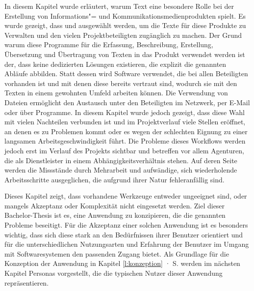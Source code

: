 In diesem Kapitel wurde erläutert, warum Text eine besondere Rolle bei der Erstellung von Informations"= und Kommunikationsmedienprodukten spielt. Es wurde gezeigt, dass  und  ausgewählt werden, um die Texte für diese Produkte zu Verwalten und den vielen Projektbeteiligten zugänglich zu machen. Der Grund warum diese Programme für die Erfassung, Beschreibung, Erstellung, Übersetzung und Übertragung von Texten in das Produkt verwendet werden ist der, dass keine dedizierten Lösungen existieren, die explizit die genannten Abläufe abbilden. Statt dessen wird Software verwendet, die bei allen Beteiligten vorhanden ist und mit denen diese bereits vertraut sind, wodurch sie mit den Texten in einem gewohnten Umfeld arbeiten können. Die Verwendung von Dateien ermöglicht den Austausch unter den Beteiligten im Netzwerk, per E-Mail oder über Programme. In diesem Kapitel wurde jedoch gezeigt, dass diese Wahl mit vielen Nachteilen verbunden ist und im Projektverlauf viele Stellen eröffnet, an denen es zu Problemen kommt oder es wegen der schlechten Eignung zu einer langsamen Arbeitsgeschwindigkeit führt. Die Probleme dieses Workflows werden jedoch erst im Verlauf des Projekts sichtbar und betreffen vor allem Agenturen, die als Dienstleister in einem Abhängigkeitsverhältnis stehen. Auf deren Seite werden die Missstände durch Mehrarbeit und aufwändige, sich wiederholende Arbeitsschritte ausgeglichen, die aufgrund ihrer Natur fehleranfällig sind.

\secbar

Dieses Kapitel zeigt, dass vorhandene Werkzeuge entweder ungeeignet sind, oder mangels Akzeptanz oder Komplexität nicht eingesetzt werden. Ziel dieser Bachelor-Thesis ist es, eine Anwendung zu konzipieren, die die genannten Probleme beseitigt. Für die Akzeptanz einer solchen Anwendung ist es besonders wichtig, dass sich diese stark an den Bedürfnissen ihrer Benutzer orientiert und für die unterschiedlichen Nutzungsarten und Erfahrung der Benutzer im Umgang mit Softwaresystemen den passenden Zugang bietet. Als Grundlage für die Konzeption der Anwendung in Kapitel \ref{l:konzeption} · S.\pageref{l:konzeption} werden im nächsten Kapitel Personas vorgestellt, die die typischen Nutzer dieser Anwendung repräsentieren.

\pagebreak